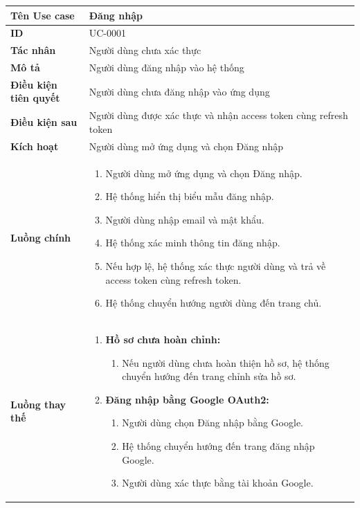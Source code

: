 {
\renewcommand{\arraystretch}{1.5}

\begin{tabularx}{\textwidth}{|>{\raggedright\arraybackslash}X|>{\raggedright\arraybackslash}X|}
\hline
\textbf{Tên Use case} & Đăng nhập \\
\hline
\textbf{ID} & UC-0001 \\
\hline
\textbf{Tác nhân} & Người dùng chưa xác thực \\
\hline
\textbf{Mô tả} & Người dùng đăng nhập vào hệ thống \\
\hline
\textbf{Điều kiện tiên quyết} & Người dùng chưa đăng nhập vào ứng dụng \\
\hline
\textbf{Điều kiện sau} & Người dùng được xác thực và nhận access token cùng refresh token \\
\hline
\textbf{Kích hoạt} & Người dùng mở ứng dụng và chọn Đăng nhập \\
\hline
\textbf{Luồng chính} &
\begin{enumerate}
    \item Người dùng mở ứng dụng và chọn Đăng nhập.
    \item Hệ thống hiển thị biểu mẫu đăng nhập.
    \item Người dùng nhập email và mật khẩu.
    \item Hệ thống xác minh thông tin đăng nhập.
    \item Nếu hợp lệ, hệ thống xác thực người dùng và trả về access token cùng refresh token.
    \item Hệ thống chuyển hướng người dùng đến trang chủ.
\end{enumerate} \\
\hline
\textbf{Luồng thay thế} &
\begin{enumerate}
    \item \textbf{Hồ sơ chưa hoàn chỉnh:}
    \begin{enumerate}
        \item[6A.] Nếu người dùng chưa hoàn thiện hồ sơ, hệ thống chuyển hướng đến trang chỉnh sửa hồ sơ.
    \end{enumerate}
    \item \textbf{Đăng nhập bằng Google OAuth2:}
    \begin{enumerate}
        \item[3B.] Người dùng chọn Đăng nhập bằng Google.
        \item[4B.] Hệ thống chuyển hướng đến trang đăng nhập Google.
        \item[5B.] Người dùng xác thực bằng tài khoản Google.

\end{enumerate}
\end{enumerate}
\end{tabularx}}
